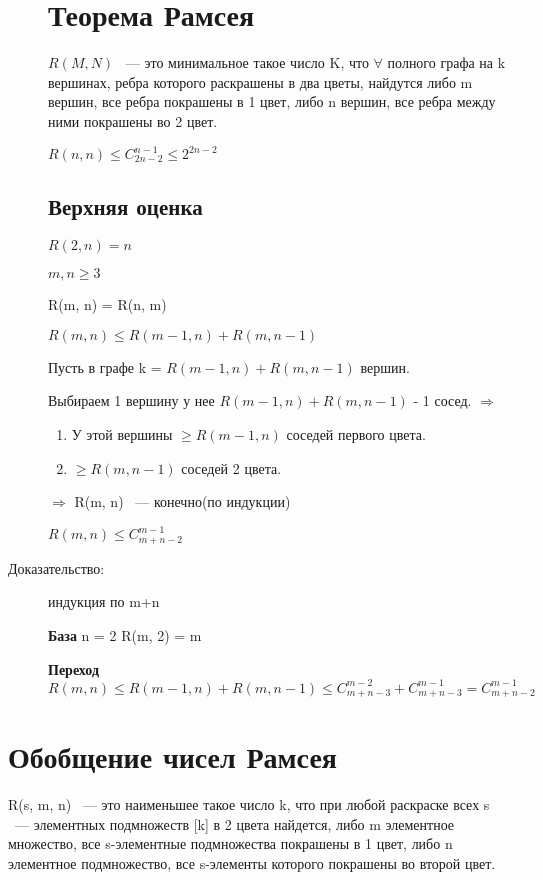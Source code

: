 \documentclass[12pt]{article}
\begin{document}
\begin{description}
\section{Теорема Рамсея}

$R(M, N)$ ~--- это минимальное такое число K, что $\forall$ полного графа на k вершинах, ребра которого раскрашены в два цветы, найдутся либо m вершин, все ребра покрашены в 1 цвет, либо n вершин, все ребра между ними покрашены во 2 цвет. 

$R(n, n) \le C_{2n - 2}^{n - 1} \le 2^{2n - 2}$
 
\subsection{Верхняя оценка}
$R(2, n) = n$

$m, n \ge 3$

R(m, n) = R(n, m)

$R(m, n) \le R(m - 1, n) + R(m, n - 1)$

Пусть в графе k = $R(m - 1, n) + R(m, n - 1)$ вершин.

Выбираем 1 вершину у нее $R(m - 1, n) + R(m, n - 1)$ - 1 сосед. $\Rightarrow$ 
\begin{enumerate}
\item У этой вершины $\ge R(m - 1, n)$ соседей первого цвета.
\item $\ge R(m, n - 1)$ соседей 2 цвета. 
\end{enumerate}

$\Rightarrow$ R(m, n) ~--- конечно(по индукции)

$R(m, n) \le C_{m + n - 2}^{m - 1}$

\item[Доказательство:] индукция по m+n 

{\bf База} n = 2 R(m, 2) = m

{\bf Переход} $R(m, n) \le R(m - 1, n) + R(m, n - 1) \le C_{m + n - 3}^{m - 2} + C_{m + n - 3}^{m - 1} = C_{m + n - 2}^{m - 1}$
\end{description}

\section{Обобщение чисел Рамсея}

R(s, m, n) ~--- это наименьшее такое число k, что при любой раскраске всех s ~--- элементных подмножеств [k] в 2 цвета найдется, либо m элементное множество, все s-элементные подмножества покрашены в 1 цвет, либо n элементное подмножество, все s-элементы которого покрашены во второй цвет. 
\end{document}
